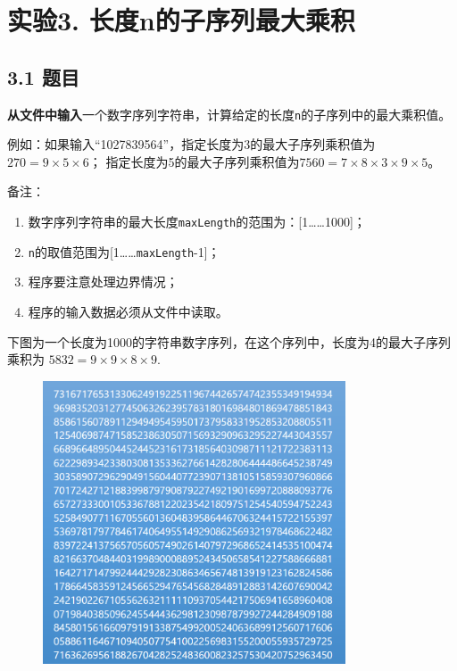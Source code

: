 \vspace{-3cm}\chapter{实验3. 长度n的子序列最大乘积}

\section{3.1 题目}
\textbf{从文件中输入}一个数字序列字符串，计算给定的长度\lstinline{n}的子序列中的最大乘积值。

例如：如果输入“1027839564”，指定长度为3的最大子序列乘积值为 $270 = 9\times 5\times 6$；
指定长度为5的最大子序列乘积值为$7560=7\times 8\times 3\times 9\times 5$。

备注：
\begin{enumerate}
    \item 数字序列字符串的最大长度\lstinline{maxLength}的范围为：[1……1000]；
    \item \lstinline{n}的取值范围为[1……\lstinline{maxLength}-1]；
    \item 程序要注意处理边界情况；
    \item 程序的输入数据必须从文件中读取。
\end{enumerate}

下图为一个长度为1000的字符串数字序列，在这个序列中，长度为4的最大子序列乘积为 $5832 = 9\times 9\times 8\times 9$. 
\begin{figure}[H]
    \centering
    \includegraphics[width = 0.8\textwidth]{../pic/3/3.0.png}
\end{figure}

